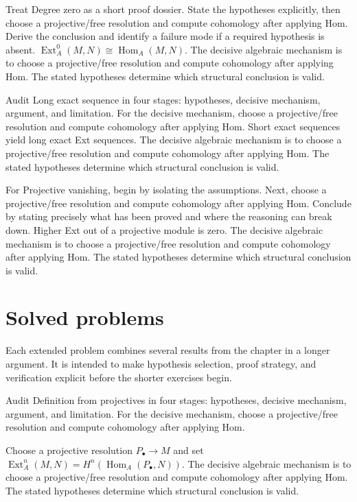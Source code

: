 \begin{example}\label{ex:v27-worked-02}
Treat Degree zero as a short proof dossier. State the hypotheses explicitly, then choose a projective/free resolution and compute cohomology after applying Hom. Derive the conclusion and identify a failure mode if a required hypothesis is absent. $\operatorname{Ext}_A^0(M,N)\cong\operatorname{Hom}_A(M,N)$. The decisive algebraic mechanism is to choose a projective/free resolution and compute cohomology after applying Hom. The stated hypotheses determine which structural conclusion is valid.
\end{example}

\begin{example}\label{ex:v27-worked-03}
Audit Long exact sequence in four stages: hypotheses, decisive mechanism, argument, and limitation. For the decisive mechanism, choose a projective/free resolution and compute cohomology after applying Hom. Short exact sequences yield long exact Ext sequences. The decisive algebraic mechanism is to choose a projective/free resolution and compute cohomology after applying Hom. The stated hypotheses determine which structural conclusion is valid.
\end{example}

\begin{example}\label{ex:v27-worked-04}
For Projective vanishing, begin by isolating the assumptions. Next, choose a projective/free resolution and compute cohomology after applying Hom. Conclude by stating precisely what has been proved and where the reasoning can break down. Higher Ext out of a projective module is zero. The decisive algebraic mechanism is to choose a projective/free resolution and compute cohomology after applying Hom. The stated hypotheses determine which structural conclusion is valid.
\end{example}

\section{Solved problems}
Each extended problem combines several results from the chapter in a longer argument. It is intended to make hypothesis selection, proof strategy, and verification explicit before the shorter exercises begin.

\begin{problem}\label{prob:v27-problem-01}
Audit Definition from projectives in four stages: hypotheses, decisive mechanism, argument, and limitation. For the decisive mechanism, choose a projective/free resolution and compute cohomology after applying Hom.
\end{problem}
\begin{solution}
Choose a projective resolution $P_\bullet\to M$ and set $\operatorname{Ext}_A^n(M,N)=H^n(\operatorname{Hom}_A(P_\bullet,N))$. The decisive algebraic mechanism is to choose a projective/free resolution and compute cohomology after applying Hom. The stated hypotheses determine which structural conclusion is valid.
\end{solution}

